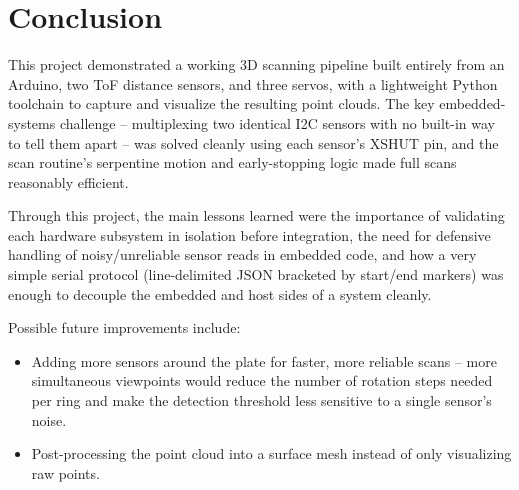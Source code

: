 \documentclass[11pt]{article}
\begin{document}
\section{Conclusion}

This project demonstrated a working 3D scanning pipeline built
entirely from an Arduino, two ToF distance sensors, and three servos,
with a lightweight Python toolchain to capture and visualize the resulting
point clouds. The key embedded-systems challenge -- multiplexing two
identical I2C sensors with no built-in way to tell them apart -- was solved
cleanly using each sensor's XSHUT pin, and the scan routine's serpentine
motion and early-stopping logic made full scans reasonably efficient.

Through this project, the main lessons learned were the importance of
validating each hardware subsystem in isolation before integration, the
need for defensive handling of noisy/unreliable sensor reads in embedded
code, and how a very simple serial protocol (line-delimited JSON bracketed
by start/end markers) was enough to decouple the embedded and host sides of
a system cleanly.

Possible future improvements include:
\begin{itemize}
  \item Adding more sensors around the plate for faster, more reliable
    scans -- more simultaneous viewpoints would reduce the number of
    rotation steps needed per ring and make the detection threshold less
    sensitive to a single sensor's noise.
  \item Post-processing the point cloud into a surface mesh instead of only visualizing raw points.
\end{itemize}
\end{document}
